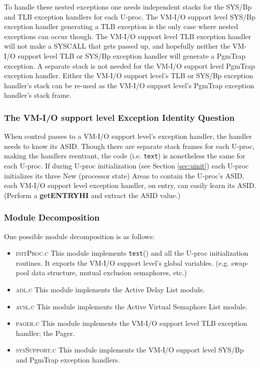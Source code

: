 To handle these nested exceptions one needs independent stacks for the SYS/Bp and TLB exception handlers for each U-proc. 
The VM-I/O support level SYS/Bp exception handler generating a TLB exception is the only case where nested exceptions can occur though. 
The VM-I/O support level TLB exception handler will not make a SYSCALL that gets passed up, and hopefully neither the VM-I/O support level TLB or SYS/Bp exception handler will generate a PgmTrap exception. 
A separate stack is not needed for the VM-I/O support level PgmTrap exception handler. 
Either the VM-I/O support level's TLB or SYS/Bp exception handler's stack can be re-used as the VM-I/O support level's PgmTrap exception handler's stack frame.


\subsubsection{The VM-I/O support level Exception Identity Question}
When control passes to a VM-I/O support level's exception handler, the handler needs to know its ASID. Though there are separate stack frames for each U-proc, making the handlers reentrant, the code (i.e. \verb+text+) is nonetheless the same for each U-proc. 
If during U-proc initialization (see Section \ref{sec:uinit}) each U-proc initializes its three New (processor state) Areas to contain the U-proc's ASID, each VM-I/O support level exception handler, on entry, can easily learn its ASID. 
(Perform a \textbf{getENTRYHI} and extract the ASID value.)


\subsubsection{Module Decomposition}
One possible module decomposition is as follows:
\begin{itemize}
\item \textsc{initProc.c} This module implements \verb+test+() and all the U-proc initialization routines. 
It exports the VM-I/O support level's global variables. (e.g. swap-pool data structure, mutual exclusion semaphores, etc.)
\item \textsc{adl.c} This module implements the Active Delay List module.
\item \textsc{avsl.c} This module implements the Active Virtual Semaphore List module.
\item \textsc{pager.c} This module implements the VM-I/O support level TLB exception handler; the Pager.
\item \textsc{sysSupport.c} This module implements the VM-I/O support level SYS/Bp and PgmTrap exception handlers.
\end{itemize}



